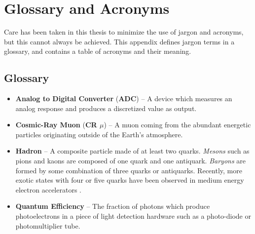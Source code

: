 \chapter{Glossary and Acronyms}
\label{app_glossary}
Care has been taken in this thesis to minimize the use of jargon and
acronyms, but this cannot always be achieved.  This appendix defines
jargon terms in a glossary, and contains a table of acronyms and their
meaning.

\section{Glossary}
\label{jargonapp}
\begin{itemize}

\item \textbf{Analog to Digital Converter} (\textbf{ADC}) -- A device which measures an analog response and produces a discretized value as output.

\item \textbf{Cosmic-Ray Muon} (\textbf{CR $\mu$}) -- A muon coming from
the abundant energetic particles originating outside of the Earth's
atmosphere.

\item \textbf{Hadron} -- A composite particle made of at least two quarks.  \textit{Mesons} such as pions and kaons are composed of one quark and one antiquark.  \textit{Baryons} are formed by some combination of three quarks or antiquarks.  Recently, more exotic states with four or five quarks have been observed in medium energy electron accelerators \cite{dias2013z_,barth2003evidence}.

\item \textbf{Quantum Efficiency} -- The fraction of photons which produce photoelectrons in a piece of light detection hardware such as a photo-diode or photomultiplier tube.
\end{itemize}

